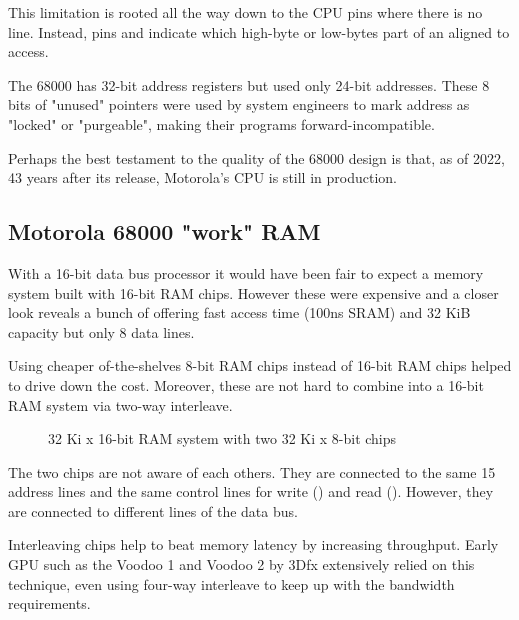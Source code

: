 This limitation is rooted all the way down to the CPU pins where there is no  line. Instead, pins  and indicate which high-byte or low-bytes part of an aligned  to access.


\begin{trivia}
 The 68000 has 32-bit address registers but used only 24-bit addresses. These 8 bits of "unused" pointers were used by system engineers to mark address as "locked" or "purgeable", making their programs forward-incompatible. 
\end{trivia}

Perhaps the best testament to the quality of the 68000 design is that, as of 2022, 43 years after its release, Motorola's CPU is still in production.


\subsection{Motorola 68000 "work" RAM}
With a 16-bit data bus processor it would have been fair to expect a memory system built with 16-bit RAM chips. However these were expensive and a closer look reveals a bunch of  offering fast access time (100ns SRAM) and 32 KiB capacity but only 8 data lines.

\pagebreak

Using cheaper of-the-shelves 8-bit RAM chips instead of 16-bit RAM chips helped to drive down the cost. Moreover, these are not hard to combine into a 16-bit RAM system via two-way interleave.

\begin{figure}[H]
\caption*{32 Ki x 16-bit RAM system with two 32 Ki x 8-bit chips}
\end{figure}

The two chips are not aware of each others. They are connected to the same 15 address lines and the same control lines for write () and read (). However, they are connected to different lines of the data bus.

 \begin{trivia}
Interleaving chips help to beat memory latency by increasing throughput. Early GPU such as the Voodoo 1 and Voodoo 2 by 3Dfx extensively relied on this technique, even using four-way interleave to keep up with the bandwidth requirements\cite{TheStoryOf3Dfx}.  
 \end{trivia}


